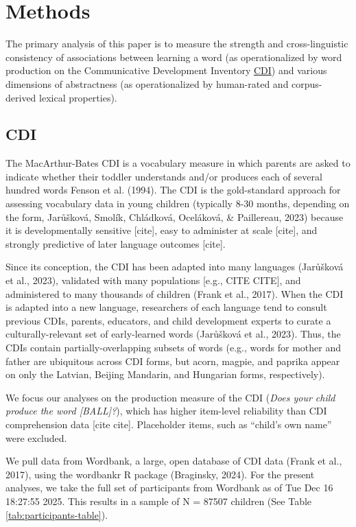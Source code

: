 \documentclass[
  man,floatsintext]{apa6}
\begin{document}
\section{Methods}\label{methods}

The primary analysis of this paper is to measure the strength and cross-linguistic consistency of associations between learning a word (as operationalized by word production on the Communicative Development Inventory \hyperref[cdi]{CDI}) and various dimensions of abstractness (as operationalized by human-rated and corpus-derived lexical properties).

\subsection{CDI}\label{cdi}

The MacArthur-Bates CDI is a vocabulary measure in which parents are asked to indicate whether their toddler understands and/or produces each of several hundred words Fenson et al. (1994). The CDI is the gold-standard approach for assessing vocabulary data in young children (typically 8-30 months, depending on the form, Jarůšková, Smolík, Chládková, Oceláková, \& Paillereau, 2023) because it is developmentally sensitive {[}cite{]}, easy to administer at scale {[}cite{]}, and strongly predictive of later language outcomes {[}cite{]}.

Since its conception, the CDI has been adapted into many languages (Jarůšková et al., 2023), validated with many populations {[}e.g., CITE CITE{]}, and administered to many thousands of children (Frank et al., 2017). When the CDI is adapted into a new language, researchers of each language tend to consult previous CDIs, parents, educators, and child development experts to curate a culturally-relevant set of early-learned words (Jarůšková et al., 2023). Thus, the CDIs contain partially-overlapping subsets of words (e.g., words for mother and father are ubiquitous across CDI forms, but acorn, magpie, and paprika appear on only the Latvian, Beijing Mandarin, and Hungarian forms, respectively).

We focus our analyses on the production measure of the CDI (\emph{Does your child produce the word {[}BALL{]}?}), which has higher item-level reliability than CDI comprehension data {[}cite cite{]}. Placeholder items, such as ``child's own name'' were excluded.

We pull data from Wordbank, a large, open database of CDI data (Frank et al., 2017), using the wordbankr R package (Braginsky, 2024). For the present analyses, we take the full set of participants from Wordbank as of Tue Dec 16 18:27:55 2025. This results in a sample of N = 87507 children (See Table \ref{tab:participants-table}).
\end{document}
